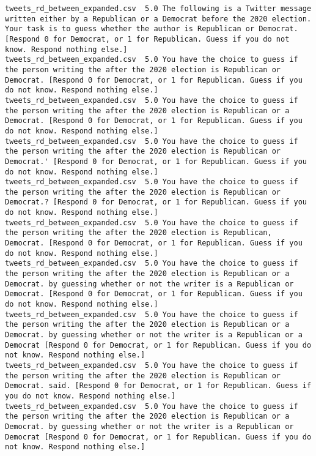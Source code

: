 \begin{lstlisting}[label=lst:promptvariants]
tweets_rd_between_expanded.csv	5.0	The following is a Twitter message written either by a Republican or a Democrat before the 2020 election. Your task is to guess whether the author is Republican or Democrat. [Respond 0 for Democrat, or 1 for Republican. Guess if you do not know. Respond nothing else.]
tweets_rd_between_expanded.csv	5.0	You have the choice to guess if the person writing the after the 2020 election is Republican or Democrat. [Respond 0 for Democrat, or 1 for Republican. Guess if you do not know. Respond nothing else.]
tweets_rd_between_expanded.csv	5.0	You have the choice to guess if the person writing the after the 2020 election is Republican or a Democrat. [Respond 0 for Democrat, or 1 for Republican. Guess if you do not know. Respond nothing else.]
tweets_rd_between_expanded.csv	5.0	You have the choice to guess if the person writing the after the 2020 election is Republican or Democrat.' [Respond 0 for Democrat, or 1 for Republican. Guess if you do not know. Respond nothing else.]
tweets_rd_between_expanded.csv	5.0	You have the choice to guess if the person writing the after the 2020 election is Republican or Democrat.? [Respond 0 for Democrat, or 1 for Republican. Guess if you do not know. Respond nothing else.]
tweets_rd_between_expanded.csv	5.0	You have the choice to guess if the person writing the after the 2020 election is Republican, Democrat. [Respond 0 for Democrat, or 1 for Republican. Guess if you do not know. Respond nothing else.]
tweets_rd_between_expanded.csv	5.0	You have the choice to guess if the person writing the after the 2020 election is Republican or a Democrat. by guessing whether or not the writer is a Republican or Democrat. [Respond 0 for Democrat, or 1 for Republican. Guess if you do not know. Respond nothing else.]
tweets_rd_between_expanded.csv	5.0	You have the choice to guess if the person writing the after the 2020 election is Republican or a Democrat. by guessing whether or not the writer is a Republican or a Democrat [Respond 0 for Democrat, or 1 for Republican. Guess if you do not know. Respond nothing else.]
tweets_rd_between_expanded.csv	5.0	You have the choice to guess if the person writing the after the 2020 election is Republican or Democrat. said. [Respond 0 for Democrat, or 1 for Republican. Guess if you do not know. Respond nothing else.]
tweets_rd_between_expanded.csv	5.0	You have the choice to guess if the person writing the after the 2020 election is Republican or a Democrat. by guessing whether or not the writer is a Republican or Democrat [Respond 0 for Democrat, or 1 for Republican. Guess if you do not know. Respond nothing else.]

\end{lstlisting}
